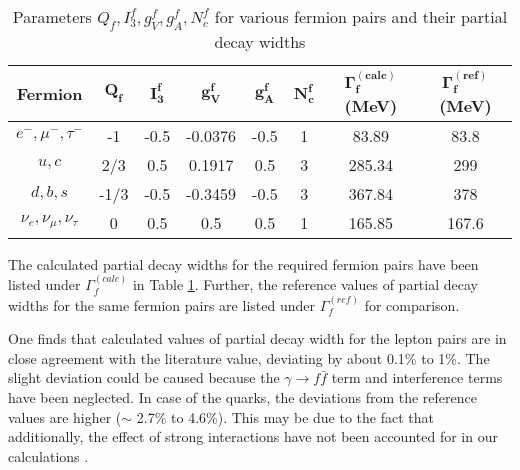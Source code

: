 \begin{table}[h!]
\centering
\begin{tabular}{|c|c|c|c|c|c|c|c|}
\hline
\textbf{Fermion} & $\mathbf{Q_{f}}$ & $\mathbf{I_{3}^{f}}$ & $\mathbf{g_{V}^{f}}$ & $\mathbf{g_{A}^{f}}$ & $\mathbf{N_{c}^{f}}$ & $\mathbf{\Gamma_{f}^{(calc)}}$ \textbf{(MeV)} & $\mathbf{\Gamma_{f}^{(ref)}}$ \textbf{(MeV)}\\
\hline
$e^{-}, \mu^{-}, \tau^{-}$ & -1 & -0.5 & -0.0376 & -0.5 & 1 & 83.89 & 83.8\\
\hline
$u,c$ & 2/3 & 0.5 & 0.1917 & 0.5 & 3 & 285.34 & 299\\
\hline
$d, b, s$ & -1/3 & -0.5 & -0.3459 & -0.5 & 3 & 367.84 & 378\\
\hline
$\nu_{e}, \nu_{\mu}, \nu_{\tau}$ & 0 & 0.5 & 0.5 & 0.5 & 1 & 165.85 & 167.6\\
\hline
\end{tabular}
\caption{Parameters $Q_{f}, I_{3}^{f}, g_{V}^{f}, g_{A}^{f}, N_{c}^{f}$ for various fermion pairs and their partial decay widths}
\label{partialdecays}
\end{table}

The calculated partial decay widths for the required fermion pairs have been listed under $\Gamma_{f}^{(calc)}$ in Table \ref{partialdecays}. Further, the reference \cite{UB} values of partial decay widths for the same fermion pairs are listed under $\Gamma_{f}^{(ref)}$ for comparison. 

One finds that calculated values of partial decay width for the lepton pairs are in close agreement with the literature value, deviating by about 0.1\% to 1\%. The slight deviation could be caused because the $\gamma\rightarrow f\bar{f}$ term \cite{Ver} and interference terms have been neglected. In case of the quarks, the deviations from the reference values are higher ($\sim$ 2.7\% to 4.6\%). This may be due to the fact that additionally, the effect of strong interactions have not been accounted for in our calculations \cite{Anna}.